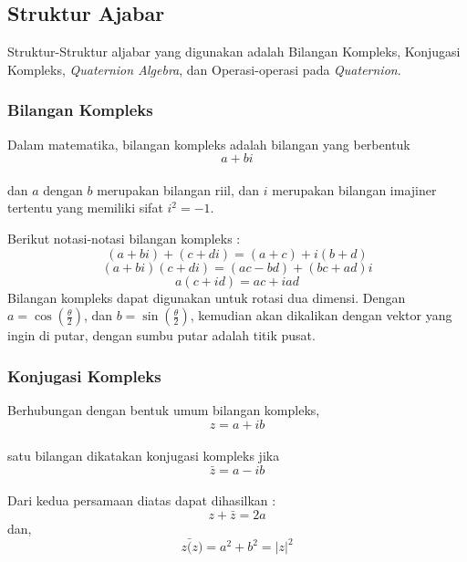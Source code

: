 \subsection{Struktur Ajabar}
Struktur-Struktur aljabar yang digunakan adalah Bilangan Kompleks, Konjugasi Kompleks, \textit{Quaternion Algebra}, dan Operasi-operasi pada \textit{Quaternion}.

\subsubsection{Bilangan Kompleks}

Dalam matematika, bilangan kompleks adalah bilangan yang berbentuk\\
\[
	a+bi
\]\cite{kuipers:1999}\\
dan \(a\) dengan \(b\) merupakan bilangan riil, dan \(i\) merupakan bilangan imajiner tertentu yang memiliki sifat \(i^2=-1\).

Berikut notasi-notasi bilangan kompleks :
\[
 (a + bi) + (c + di) = (a+c) + i(b+d)
\]
\[
 (a + bi)(c + di) = (ac−bd) + (bc+ad)i
\]
\[
 a(c + id) = ac + iad
\]
Bilangan kompleks dapat digunakan untuk rotasi dua dimensi. Dengan \(a = \cos (\frac{\theta}{2})\), dan \(b = \sin(\frac{\theta}{2})\), kemudian akan dikalikan dengan vektor yang ingin di putar, dengan sumbu putar adalah titik pusat.


\subsubsection{Konjugasi Kompleks}
\cite{kuipers:1999}Berhubungan dengan bentuk umum bilangan kompleks,
\[
	z = a + ib
\]\\
satu bilangan dikatakan konjugasi kompleks jika
\[
	\bar{z} = a - ib
\]\\
Dari kedua persamaan diatas dapat dihasilkan :
\[
	z + \bar{z} = 2a
\]dan,
\[
	z \bar(z) = a^2 +b^2 = |z|^2
\]

